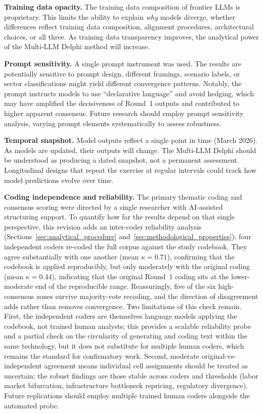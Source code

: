\documentclass[preprint,review,12pt]{elsarticle}
\begin{document}
\textbf{Training data opacity.} The training data composition of frontier LLMs is proprietary. This limits the ability to explain \textit{why} models diverge, whether differences reflect training data composition, alignment procedures, architectural choices, or all three. As training data transparency improves, the analytical power of the Multi-LLM Delphi method will increase.

\textbf{Prompt sensitivity.} A single prompt instrument was used. The results are potentially sensitive to prompt design, different framings, scenario labels, or sector classifications might yield different convergence patterns. Notably, the prompt instructs models to use ``declarative language'' and avoid hedging, which may have amplified the decisiveness of Round~1 outputs and contributed to higher apparent consensus. Future research should employ prompt sensitivity analysis, varying prompt elements systematically to assess robustness.

\textbf{Temporal snapshot.} Model outputs reflect a single point in time (March 2026). As models are updated, their outputs will change. The Multi-LLM Delphi should be understood as producing a dated snapshot, not a permanent assessment. Longitudinal designs that repeat the exercise at regular intervals could track how model predictions evolve over time.

\textbf{Coding independence and reliability.} The primary thematic coding and consensus scoring were directed by a single researcher with AI-assisted structuring support. To quantify how far the results depend on that single perspective, this revision adds an inter-coder reliability analysis (Sections~\ref{sec:analytical_procedure} and~\ref{sec:methodological_properties}): four independent coders re-coded the full corpus against the study codebook. They agree substantially with one another (mean $\kappa=0.71$), confirming that the codebook is applied reproducibly, but only moderately with the original coding (mean $\kappa=0.44$), indicating that the original Round~1 coding sits at the lower-moderate end of the reproducible range. Reassuringly, five of the six high-consensus zones survive majority-vote recoding, and the direction of disagreement adds rather than removes convergence. Two limitations of this check remain. First, the independent coders are themselves language models applying the codebook, not trained human analysts; this provides a scalable reliability probe and a partial check on the circularity of generating and coding text within the same technology, but it does not substitute for multiple human coders, which remains the standard for confirmatory work. Second, moderate original-vs-independent agreement means individual cell assignments should be treated as uncertain; the robust findings are those stable across coders and thresholds (labor market bifurcation, infrastructure bottleneck repricing, regulatory divergence). Future replications should employ multiple trained human coders alongside the automated probe.
\end{document}
